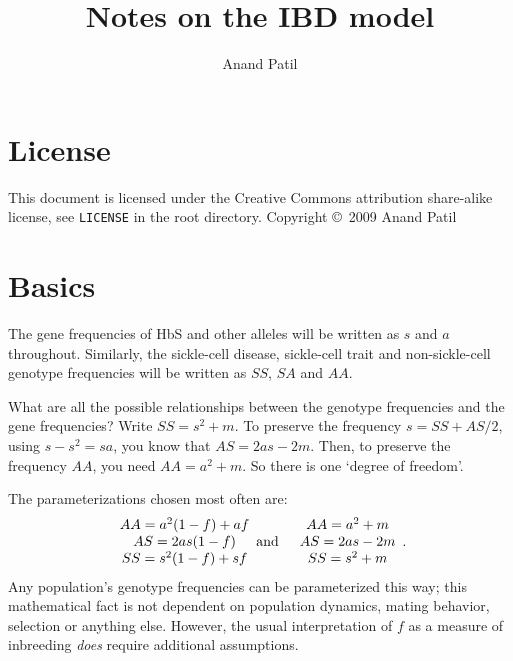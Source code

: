 \documentclass[a4paper]{article}
\begin{document}
\title{Notes on the IBD model}
\author{Anand Patil}
\maketitle

\section{License} %
\label{sec:license}
This document is licensed under the Creative Commons attribution share-alike license, see \texttt{LICENSE} in the root directory. Copyright \copyright\ 2009 Anand Patil

\section{Basics} %
\label{sec:basics}

The gene frequencies of HbS and other alleles will be written as $s$ and $a$ throughout. Similarly, the sickle-cell disease, sickle-cell trait and non-sickle-cell genotype frequencies will be written as $SS$, $SA$ and $AA$.

What are all the possible relationships between the genotype frequencies and the gene frequencies? Write $SS=s^2+m$. To preserve the frequency $s=SS+AS/2$, using $s-s^2=sa$, you know that $AS=2as-2m$. Then, to preserve the frequency $AA$, you need $AA=a^2+m$. So there is one `degree of freedom'.

The parameterizations chosen most often are:
\begin{eqnarray*}
\begin{array}{c}AA=a^2(1-f)+af\\AS=2as(1-f)\\SS=s^2(1-f)+sf\end{array} &\textup{and}&
\begin{array}{c}AA=a^2+m\\AS=2as-2m\\SS=s^2+m\end{array}.
\end{eqnarray*}
Any population's genotype frequencies can be parameterized this way; this mathematical fact is not dependent on population dynamics, mating behavior, selection or anything else. However, the usual interpretation of $f$ as a measure of inbreeding \emph{does} require additional assumptions. 
\end{document}
